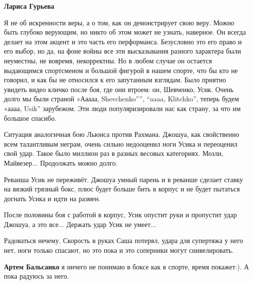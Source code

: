 \begin{itemize}
\begin{itemize}
\textbf{Лариса Гурьева} 

Я не об искренности веры, а о том, как он демонстрирует свою веру. Можно быть
глубоко верующим, но никто об этом может не узнать, наверное. Он всегда делает
на этом акцент и это часть его перформанса. Безусловно это его право и его
выбор, но да, на фоне войны все эти высказывания разного характера были
неуместны, не вовремя, некорректны. Но в любом случае он остается выдающимся
спортсменом и большой фигурой в нашем спорте, что бы кто не говорил, и как бы
не относился к его запутанным взглядам. Было приятно увидеть видео кличко после
боя, где они втроем: он, Шевченко, Усик. Очень долго мы были страной «Ааааа,
Shevchenko””, “aaaa, Klitchko”, теперь будем «аааа, Usik” зарубежом. Эти люди
популяризировали нас как страну, за что им большое спасибо.

\end{itemize} %


Ситуация аналогичная бою Льюиса против Рахмана. Джошуа, как свойственно всем
талантливым неграм, очень сильно недооценил ноги Усика и переоценил свой удар.
Такое было миллион раз в разных весовых категориях. Мозли, Майвезер...
Продолжать можно долго.

Реванша Усик не переживёт. Джошуа умный парень и в реванше сделает ставку на
вязкий грязный бокс, плюс будет больше бить в корпус и не будет пытаться
догнать Усика и идти на размен.

После половины боя с работой в корпус, Усик опустит руки и пропустит удар
Джошуа, а это все... Держать удар Усик не умеет...

Радоваться нечему. Скорость в руках Саша потерял, удара для супертяжа у него
нет, ноги только спасают, но это пока и это соперники могут снивелировать.

\begin{itemize} %
\textbf{Артем Бальсанко} я ничего не понимаю в боксе как в спорте, время покажет:). А пока радуюсь за него.
\end{itemize} %

\end{itemize} %
